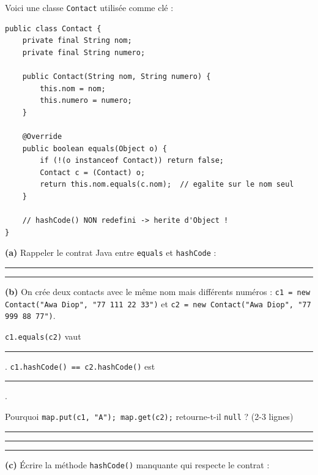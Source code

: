 \documentclass[11pt,a4paper]{article}
\begin{document}
Voici une classe \texttt{Contact} utilisée comme clé :

\begin{lstlisting}[style=java]
public class Contact {
    private final String nom;
    private final String numero;

    public Contact(String nom, String numero) {
        this.nom = nom;
        this.numero = numero;
    }

    @Override
    public boolean equals(Object o) {
        if (!(o instanceof Contact)) return false;
        Contact c = (Contact) o;
        return this.nom.equals(c.nom);  // egalite sur le nom seul
    }

    // hashCode() NON redefini -> herite d'Object !
}
\end{lstlisting}

\textbf{(a)} Rappeler le contrat Java entre \texttt{equals} et \texttt{hashCode} : \rule{8cm}{0.4pt}

\medskip
\rule{17cm}{0.4pt}

\medskip

\textbf{(b)} On crée deux contacts avec le même nom mais différents numéros :
\texttt{c1 = new Contact("Awa Diop", "77 111 22 33")}
et \texttt{c2 = new Contact("Awa Diop", "77 999 88 77")}.

\medskip

\texttt{c1.equals(c2)} vaut \rule{2cm}{0.4pt}. \quad \texttt{c1.hashCode() == c2.hashCode()} est \rule{4cm}{0.4pt}.

\medskip

Pourquoi \texttt{map.put(c1, "A"); map.get(c2);} retourne-t-il \texttt{null} ? (2-3 lignes)

\medskip
\rule{17cm}{0.4pt}

\vspace{0.3cm}
\rule{17cm}{0.4pt}

\vspace{0.3cm}
\rule{17cm}{0.4pt}

\medskip

\textbf{(c)} Écrire la méthode \texttt{hashCode()} manquante qui respecte le contrat :

\medskip

\begin{center}
\end{center}
\end{document}
